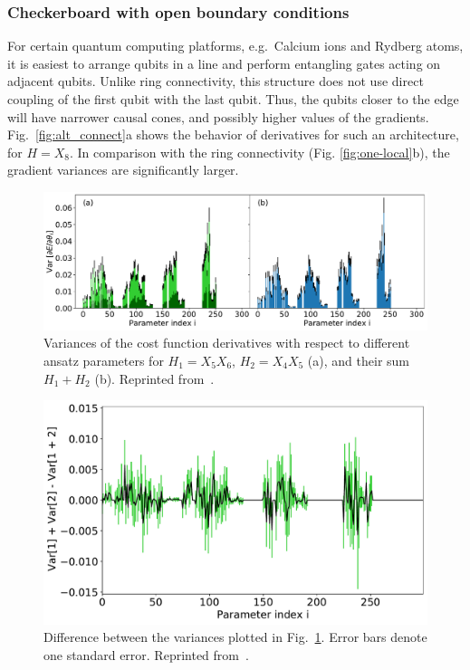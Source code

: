 \subsubsection{Checkerboard with open boundary conditions}

For certain quantum computing platforms, e.g.~Calcium ions and Rydberg atoms, it is easiest to arrange qubits in a line and perform entangling gates acting on adjacent qubits. Unlike ring connectivity, this structure does not use direct coupling of the first qubit with the last qubit. Thus, the qubits closer to the edge will have narrower causal cones, and possibly higher values of the gradients. Fig.~\ref{fig:alt_connect}a shows the behavior of derivatives for such an architecture, for $H = X_8$. In comparison with the ring connectivity (Fig. \ref{fig:one-local}b), the gradient variances are significantly larger.

\begin{figure}
    \centering
    \includegraphics[width=\linewidth]{figures/sums_comparison_separate.pdf}
    \caption{Variances of the cost function derivatives with respect to different ansatz parameters for $H_1 = X_5 X_6$, $H_2 = X_4 X_5$ (a), and their sum $H_1 + H_2$ (b). Reprinted from~\cite{uvarov_barren_2021}.}
    \label{fig:additive}
\end{figure}

\begin{figure}
    \centering
    \includegraphics[width=0.7\linewidth]{figures/sums_comparison_difference.pdf}
    \caption{Difference between the variances plotted in Fig.~\ref{fig:additive}. Error bars denote one standard error. Reprinted from~\cite{uvarov_barren_2021}.}
    \label{fig:additive_delta}
\end{figure}


